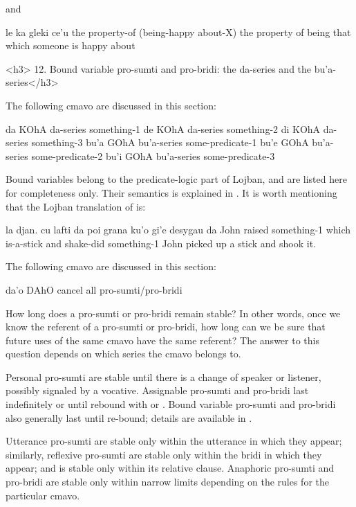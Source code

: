 {\noindent}and
\begin{example}
le ka gleki ce'u\n
the property-of (being-happy about-X)\n
the property of being that which\n
\T	someone is happy about
\end{example}

<h3>
12. Bound variable pro-sumti and pro-bridi: the da-series
    and the bu'a-series</h3>

The following cmavo are discussed in this section:

   da  KOhA    da-series   something-1
    de  KOhA    da-series   something-2
    di  KOhA    da-series   something-3
    bu'a    GOhA    bu'a-series some-predicate-1
    bu'e    GOhA    bu'a-series some-predicate-2
    bu'i    GOhA    bu'a-series some-predicate-3    

Bound variables belong to the predicate-logic part of Lojban,
    and are listed here for completeness only. Their semantics is
    explained in . It is worth
    mentioning that the Lojban translation of  is:
\begin{example}
la djan. cu lafti\n
\T	da poi grana ku'o\n
\T	gi'e desygau da\n
John raised\n
\T	something-1 which is-a-stick\n
\T	and shake-did something-1\n
John picked up a stick and shook it.
\end{example}



The following cmavo are discussed in this section:

   da'o    DAhO        cancel all pro-sumti/pro-bridi

How long does a pro-sumti or pro-bridi remain stable? In other
    words, once we know the referent of a pro-sumti or pro-bridi,
    how long can we be sure that future uses of the same cmavo have
    the same referent? The answer to this question depends on which
    series the cmavo belongs to. 

Personal pro-sumti are stable until there is a change of
    speaker or listener, possibly signaled by a vocative.
    Assignable pro-sumti and pro-bridi last indefinitely or until
    rebound with  or . Bound variable pro-sumti and
    pro-bridi also generally last until re-bound; details are
    available in .

Utterance pro-sumti are stable only within the utterance in
    which they appear; similarly, reflexive pro-sumti are stable
    only within the bridi in which they appear; and  is
    stable only within its relative clause. Anaphoric pro-sumti and
    pro-bridi are stable only within narrow limits depending on the
    rules for the particular cmavo.

